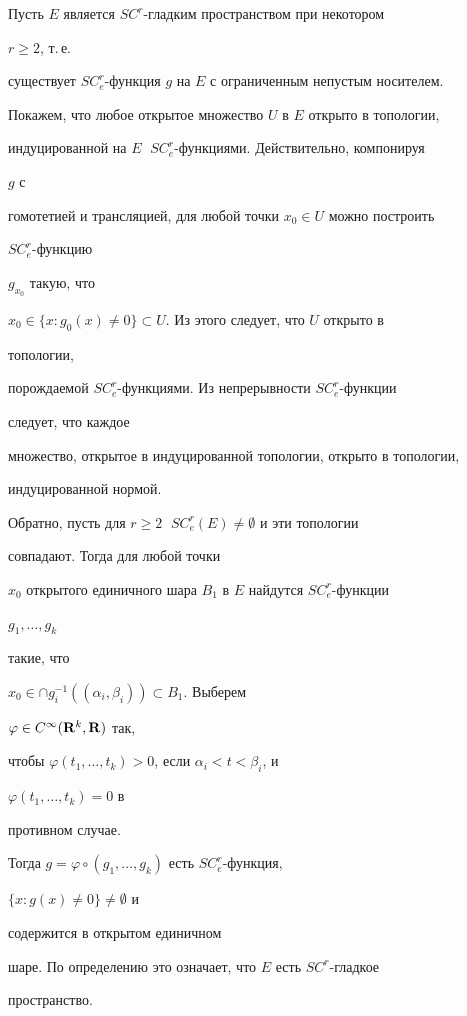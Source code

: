 \begin{pf}


Пусть $E$ является $SC^r$-гладким пространством при некотором


$r\ge 2$, т.\,е.


существует $SC^r_e$-функция $g$ на $E$ с ограниченным непустым носителем.


Покажем, что любое открытое множество $U$ в $E$ открыто в топологии,


индуцированной на $E\;$ $SC^r_e$-функциями. Действительно, компонируя


$g$ с


гомотетией и трансляцией, для любой точки $x_0\in U$ можно построить


$SC^r_e$-функцию


$g_{x_0}$ такую, что


$x_0\in\{x:g_0(x)\ne 0\}\subset U$. Из этого следует, что $U$ открыто в


топологии,


порождаемой $SC^r_e$-функциями. Из непрерывности $SC^r_e$-функции


следует, что каждое


множество, открытое в индуцированной топологии, открыто в топологии,


индуцированной нормой.





Обратно, пусть для $r\ge 2\;$ $SC^r_e(E)\ne\emptyset$ и эти топологии


совпадают. Тогда для любой точки


$x_0$ открытого единичного шара $B_1$ в $E$ найдутся $SC^r_e$-функции


$g_1,\dotsc,g_k$


такие, что


$x_0\in\cap g^{-1}_i((\alpha_i,\beta_i))\subset B_1$. Выберем


$\varphi\in C^\infty(\bold R^k,\bold R)$ так,


чтобы $\varphi(t_1,\dotsc,t_k)>0$, если $\alpha_i<t<\beta_i$, и


$\varphi(t_1,\dotsc,t_k)=0$ в


противном случае.


Тогда $g=\varphi\circ(g_1,\dotsc,g_k)$ есть $SC^r_e$-функция,


$\{x:g(x)\ne 0\}\ne\emptyset$ и


содержится в открытом единичном


шаре. По определению это означает, что $E$ есть $SC^r$-гладкое


пространство.


\end{pf}





